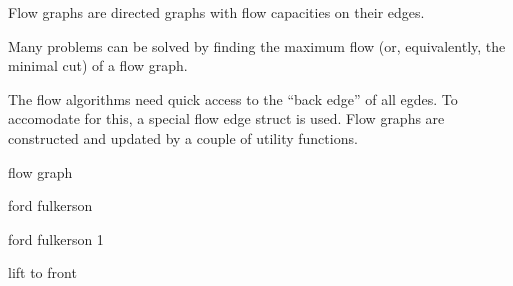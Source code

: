 
Flow graphs are directed graphs with flow capacities on their edges.

Many problems can be solved by finding the maximum flow (or, equivalently,
the minimal cut) of a flow graph.

The flow algorithms need quick access to the ``back edge'' of all egdes.
To accomodate for this, a special flow edge struct is used.
Flow graphs are constructed and updated by a couple of utility functions.

\begin{algorithm}{flow graph}
\end{algorithm}

\begin{algorithm}{ford fulkerson}
\end{algorithm}

\begin{algorithm}{ford fulkerson 1}
\end{algorithm}

\begin{algorithm}{lift to front}
\end{algorithm}

